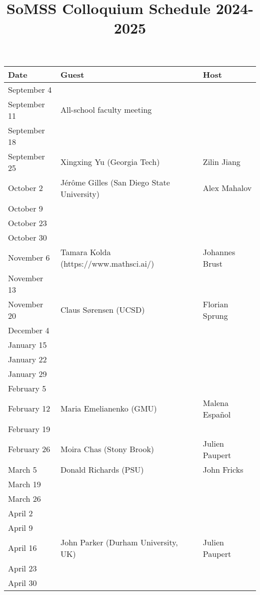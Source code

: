 \documentclass[11pt]{article}
\begin{document}
\title{SoMSS Colloquium Schedule 2024-2025}
\author{}
\date{}
\maketitle



\begin{table}[htp]
\begin{center}
\begin{tabular}{|l|l|l|}
\hline
Date & Guest & Host\\
\hline
September 4 & & \\
September 11 & All-school faculty meeting & \\
September 18 & & \\
September 25 & Xingxing Yu (Georgia Tech) & Zilin Jiang\\
October 2 &J\'er\^ome Gilles (San Diego State University)& Alex Mahalov \\
October 9 & & \\
October 23 & & \\
October 30 & & \\
November 6 & Tamara Kolda (https://www.mathsci.ai/) & Johannes Brust\\
November 13 & & \\
November 20 &Claus S\o rensen (UCSD) & Florian Sprung \\
December 4 & & \\
January 15 & & \\
January 22 & & \\
January 29 & & \\
February 5 & & \\
February 12 & Maria Emelianenko (GMU) & Malena Espa\~nol\\
February 19 & & \\
February 26  & Moira Chas (Stony Brook) & Julien Paupert \\
March 5 & Donald Richards (PSU) & John Fricks \\
March 19 & & \\
March 26 & & \\
April 2 & & \\
April 9 & & \\
April 16 & John Parker (Durham University, UK)& Julien Paupert \\
April 23 & & \\
April 30 & & \\
\hline
\end{tabular}
\end{center}
\label{default}
\end{table}%
\end{document}
